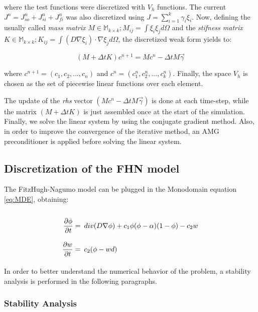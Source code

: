 where the test functions were discretized with $V_h$ functions. The current $J^n = J_{so}^n + J_{si}^n + J_{fi}^n$ was also discretized using $J = \sum_{i=1}^k \gamma_i \xi_i$. Now, defining the usually called \textsl{mass matrix}  $M \in \mathbb{M}_{k \times k}; M_{ij} = \int \xi_i \xi_j d \Omega $ and the \textsl{stifness matrix} $K \in \mathbb{M}_{k \times k}; K_{ij} = \int (D \nabla \xi_i) \cdot \nabla \xi_j d \Omega$, the discretized weak form yields to:

\begin{equation}
(M + \Delta t K) c^{n+1} = M c^n - \Delta t M \vec{\gamma} \label{eq:Ax=b}
\end{equation}

where $c^{n+1} = (c_1, c_2, ..., c_n)$ and $c^n = (c_1^n, c_2^n, ..., c_k^n)$. Finally, the space $V_h$ is chosen as the set of piecewise linear functions over each element.

The update of the \textsl{rhs} vector $(M c^n - \Delta t M \vec{\gamma})$ is done at each time-step, while the matrix $(M + \Delta t K)$ is just assembled once at the start of the simulation. Finally, we solve the linear system by using the conjugate gradient method. Also, in order to improve the convergence of the iterative method, an AMG preconditioner is applied before solving the linear system.


\subsection{Discretization of the FHN model}

The FitzHugh-Nagumo model can be plugged in the Monodomain equation \eqref{eq:MDE}, obtaining:  

\begin{equation}
\arraycolsep=2.5pt\def\arraystretch{2.8}
\begin{array}{rl}
\dfrac{\partial \phi}{ \partial t} = & div(D \nabla \phi) + c_1 \phi (\phi - \alpha)(1 - \phi) - c_2 w \\ 
\dfrac{\partial w}{\partial t} = & c_2 (\phi - wd)\\
\end{array}
 \label{eq:MONO+FHN}
\end{equation}

In order to better understand the numerical behavior of the problem, a stability analysis is performed in the following paragraphs.

\subsubsection{Stability Analysis}

